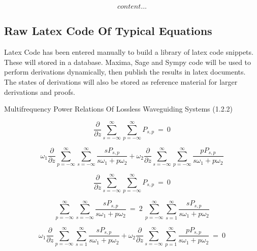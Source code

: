 \documentclass{article}
\begin{document}
\begin{equation}
content...
\end{equation}
\newpage
	

\subsection{Raw Latex Code Of Typical Equations}

Latex Code has been entered manually to build a library of latex code snippets. These will stored in a database. Maxima, Sage and Sympy code will be used to perform derivations dynamically, then publish the results in latex documents. The states of derivations will also be stored as reference material for larger derivations and proofs. \newline

\vspace{0.25cm}
\small{Multifrequency Power Relations Of Lossless Waveguiding Systems (1.2.2)} \newline

% 
%


\begin{equation}
	\frac{\partial}{\partial{z}}\sum_{s=-\infty}^{\infty}\sum_{p=-\infty}^{\infty}P_{s,p}~=~0
\end{equation}

\begin{equation}
	\omega_{1}\frac{\partial}{\partial{z}}\sum_{p=-\infty}^{\infty}\sum_{s=-\infty}^{\infty} 
	\frac{s P_{s,p}}{ s\omega_1 + p\omega_2}
	+ 
	\omega_2 \frac{\partial}{\partial{z}}\sum_{s=-\infty}^{\infty}\sum_{p=-\infty}^{\infty}
	\frac{p P_{s,p}}{ s\omega_1 + p\omega_2}
\end{equation}

\begin{equation}
	\frac{\partial}{\partial{z}}\sum_{s=-\infty}^{\infty}\sum_{p=-\infty}^{\infty}P_{s,p}~=~0
\end{equation}

\begin{equation}
\sum_{p=-\infty}^{\infty}\sum_{s=-\infty}^{\infty}\frac{s P_{s,p}}{ s\omega_1 + p\omega_2}
~=~ 
2~\sum_{p=-\infty}^{\infty}\sum_{s=1}^{\infty}
\frac{s P_{s,p}}{ s\omega_1 + p\omega_2}
\end{equation}

\begin{equation}
\omega_{1}\frac{\partial}{\partial{z}}\sum_{p=-\infty}^{\infty}\sum_{s=1}^{\infty} 
\frac{s P_{s,p}}{ s\omega_1 + p\omega_2}
+ 
\omega_2 \frac{\partial}{\partial{z}}\sum_{s=-\infty}^{\infty}\sum_{p=1}^{\infty}
\frac{p P_{s,p}}{ s\omega_1 + p\omega_2}
~=~0
\end{equation}
\end{document}
